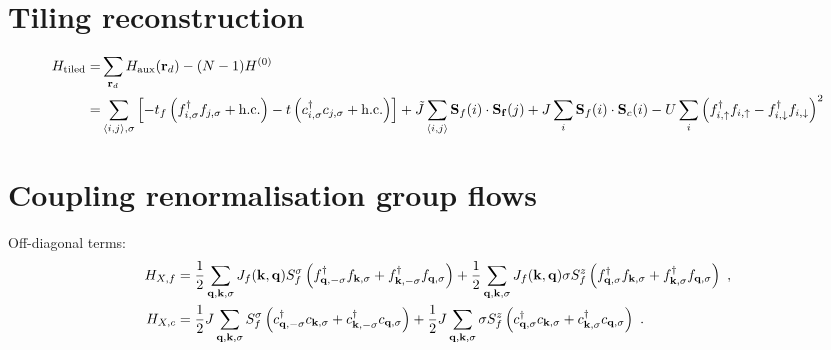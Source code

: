 \documentclass[%
reprint,
superscriptaddress,
groupedaddress,
superscriptaddress,
onecolumn,
]{revtex4-2}
\begin{document}
\section{Tiling reconstruction}
\begin{equation}\begin{aligned}
	H_\text{tiled} =& \sum_{{\bf r}_d}H_\text{aux}({\bf r}_d) - (N-1) H^{(0)} \\
	=& \sum_{\braket{i,j},\sigma}\left[-t_f\left(f^\dagger_{i,\sigma}f_{j,\sigma} + \text{h.c.}\right) -t\left(c^\dagger_{i,\sigma}c_{j,\sigma} + \text{h.c.}\right)\right] + \tilde J \sum_{\braket{i,j}}{\bf S}_f(i) \cdot {\bf S_f}(j) + J\sum_i {\bf S}_f(i)\cdot {\bf S}_c(i) - U\sum_i \left(f^\dagger_{i,\uparrow}f_{i,\uparrow} - f^\dagger_{i,\downarrow}f_{i,\downarrow}\right)^2
\end{aligned}\end{equation}

\section{Coupling renormalisation group flows}
Off-diagonal terms:
\begin{equation}\begin{aligned}
	H_{X, f} &= \frac{1}{2}\sum_{{\bf q},{\bf k},\sigma}J_f({\bf k},{\bf q}) S_f^\sigma \left(f^\dagger_{{\bf q},-\sigma}f_{{\bf k},\sigma} + f^\dagger_{{\bf k},-\sigma}f_{{\bf q},\sigma}\right) + \frac{1}{2}\sum_{{\bf q},{\bf k},\sigma}J_f({\bf k},{\bf q}) \sigma S_f^z \left(f^\dagger_{{\bf q},\sigma}f_{{\bf k},\sigma} + f^\dagger_{{\bf k},\sigma}f_{{\bf q},\sigma}\right)~,\\
	H_{X, c} &= \frac{1}{2}J\sum_{{\bf q},{\bf k},\sigma} S_f^\sigma \left(c^\dagger_{{\bf q},-\sigma}c_{{\bf k},\sigma} + c^\dagger_{{\bf k},-\sigma}c_{{\bf q},\sigma}\right) + \frac{1}{2}J\sum_{{\bf q},{\bf k},\sigma} \sigma S_f^z \left(c^\dagger_{{\bf q},\sigma}c_{{\bf k},\sigma} + c^\dagger_{{\bf k},\sigma}c_{{\bf q},\sigma}\right)~.
\end{aligned}\end{equation}
\end{document}
